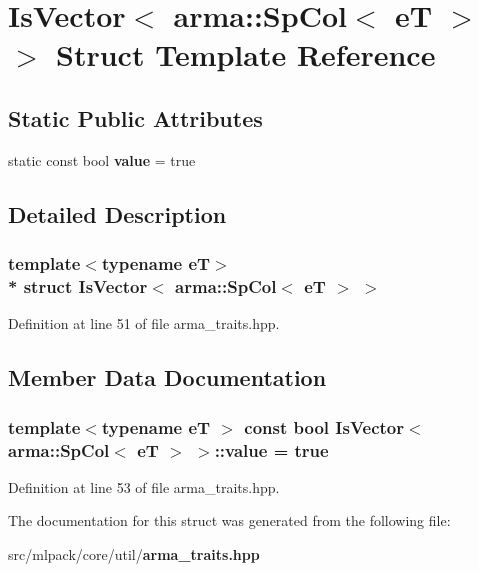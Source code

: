\section{Is\+Vector$<$ arma\+:\+:Sp\+Col$<$ eT $>$ $>$ Struct Template Reference}
\label{structIsVector_3_01arma_1_1SpCol_3_01eT_01_4_01_4}
\subsection*{Static Public Attributes}
\begin{DoxyCompactItemize}
\item 
static const bool {\bf value} = true
\end{DoxyCompactItemize}


\subsection{Detailed Description}
\subsubsection*{template$<$typename eT$>$\\*
struct Is\+Vector$<$ arma\+::\+Sp\+Col$<$ e\+T $>$ $>$}



Definition at line 51 of file arma\+\_\+traits.\+hpp.



\subsection{Member Data Documentation}
\subsubsection[{value}]{\setlength{\rightskip}{0pt plus 5cm}template$<$typename eT $>$ const bool {\bf Is\+Vector}$<$ arma\+::\+Sp\+Col$<$ eT $>$ $>$\+::value = true\hspace{0.3cm}{\ttfamily [static]}}\label{structIsVector_3_01arma_1_1SpCol_3_01eT_01_4_01_4_a611edc88eef6969629ac2e0991bc32c9}


Definition at line 53 of file arma\+\_\+traits.\+hpp.



The documentation for this struct was generated from the following file\+:\begin{DoxyCompactItemize}
\item 
src/mlpack/core/util/{\bf arma\+\_\+traits.\+hpp}\end{DoxyCompactItemize}
